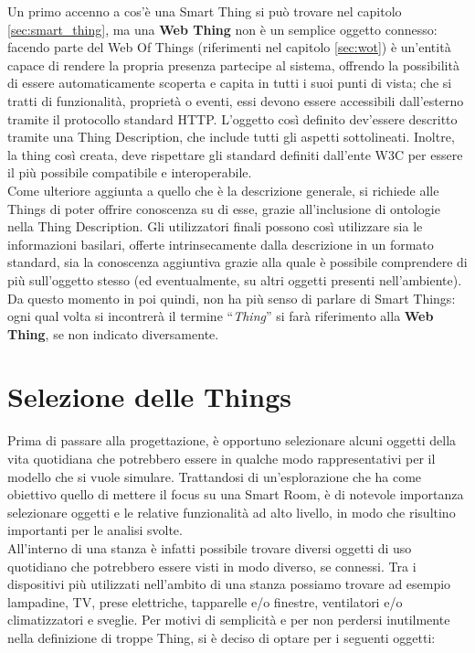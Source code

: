 \documentclass[12pt,a4paper,openright,oneside]{report}
\newcommand{\quotes}[1]{``#1''}
\begin{document}
Un primo accenno a cos'è una Smart Thing si può trovare nel capitolo \ref{sec:smart_thing}, ma una \textbf{Web Thing} non è un semplice oggetto connesso: facendo parte del Web Of Things (riferimenti nel capitolo \ref{sec:wot}) è un'entità capace di rendere la propria presenza partecipe al sistema, offrendo la possibilità di essere automaticamente scoperta e capita in tutti i suoi punti di vista; che si tratti di funzionalità, proprietà o eventi, essi devono essere accessibili dall'esterno tramite il protocollo standard HTTP. L'oggetto così definito \mbox{dev'essere} descritto tramite una Thing Description, che include tutti gli aspetti sottolineati. Inoltre, la thing così creata, deve rispettare gli standard definiti dall'ente W3C per essere il più possibile compatibile e interoperabile.\\

Come ulteriore aggiunta a quello che è la descrizione generale, si richiede alle Things di poter offrire conoscenza su di esse, grazie all'inclusione di ontologie nella Thing Description. Gli utilizzatori finali possono così utilizzare sia le informazioni basilari, offerte intrinsecamente dalla descrizione in un formato standard, sia la conoscenza aggiuntiva grazie alla quale è possibile comprendere di più sull'oggetto stesso (ed eventualmente, su altri oggetti presenti nell'ambiente).\\

Da questo momento in poi quindi, non ha più senso di parlare di Smart Things: ogni qual volta si incontrerà il termine \quotes{\textit{Thing}} si farà riferimento alla \textbf{Web Thing}, se non indicato diversamente.


\section{Selezione delle Things}
\label{sec:modellazione-things}
Prima di passare alla progettazione, è opportuno selezionare alcuni oggetti della vita quotidiana che potrebbero essere in qualche modo rappresentativi per il modello che si vuole simulare. Trattandosi di un'esplorazione che ha come obiettivo quello di mettere il focus su una Smart Room, è di notevole importanza selezionare oggetti e le relative funzionalità ad alto livello, in modo che risultino importanti per le analisi svolte.\\

All'interno di una stanza è infatti possibile trovare diversi oggetti di uso quotidiano che potrebbero essere visti in modo diverso, se connessi. Tra i dispositivi più utilizzati nell'ambito di una stanza possiamo trovare ad esempio lampadine, TV, prese elettriche, tapparelle e/o finestre, ventilatori e/o climatizzatori e sveglie. Per motivi di semplicità e per non perdersi inutilmente nella definizione di troppe Thing, si è deciso di optare per i seguenti oggetti:
\end{document}
